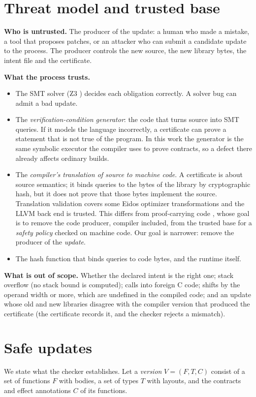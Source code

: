 \documentclass[10pt,twocolumn]{article}
\begin{document}
\section{Threat model and trusted base}\label{sec-threat}
\textbf{Who is untrusted.} The producer of the update: a human who made a mistake, a tool that proposes patches, or an attacker who can submit a candidate update to the process. The producer controls the new source, the new library bytes, the intent file and the certificate.

\textbf{What the process trusts.}

\begin{itemize}
\item The SMT solver (Z3 \cite{demoura2008z3}) decides each obligation correctly. A solver bug can admit a bad update.
\item The \emph{verification-condition generator}: the code that turns source into SMT queries. If it models the language incorrectly, a certificate can prove a statement that is not true of the program. In this work the generator is the same symbolic executor the compiler uses to prove contracts, so a defect there already affects ordinary builds.
\item The \emph{compiler's translation of source to machine code}. A certificate is about source semantics; it binds queries to the bytes of the library by cryptographic hash, but it does not prove that those bytes implement the source. Translation validation covers some Eidos optimizer transformations \cite{pnueli1998tv,necula2000tv,lopes2021alive2} and the LLVM back end is trusted. This differs from proof-carrying code \cite{necula1996pcc}, whose goal is to remove the code producer, compiler included, from the trusted base for a \emph{safety policy} checked on machine code. Our goal is narrower: remove the producer of the \emph{update}.
\item The hash function that binds queries to code bytes, and the runtime itself.
\end{itemize}
\textbf{What is out of scope.} Whether the declared intent is the right one; stack overflow (no stack bound is computed); calls into foreign C code; shifts by the operand width or more, which are undefined in the compiled code; and an update whose old and new libraries disagree with the compiler version that produced the certificate (the certificate records it, and the checker rejects a mismatch).

\section{Safe updates}\label{sec-safe}
We state what the checker establishes. Let a \emph{version} $V = (F, T, C)$ consist of a set of functions $F$ with bodies, a set of types $T$ with layouts, and the contracts and effect annotations $C$ of its functions.
\end{document}
